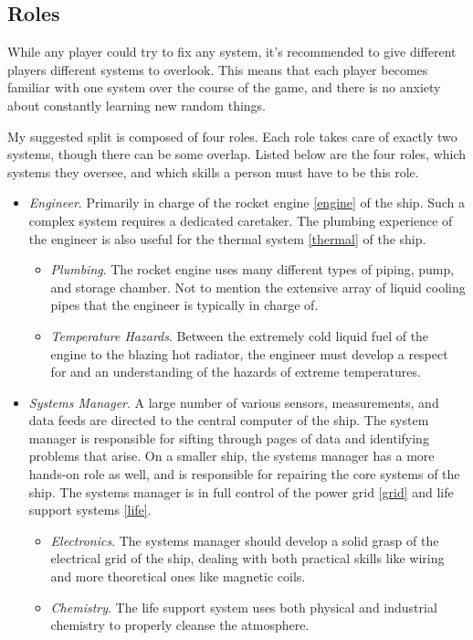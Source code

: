 \documentclass[a4paper]{article}
\begin{document}
\subsection{Roles}

While any player could try to fix any system, it's recommended to give different players different systems to overlook. This means that each player becomes familiar with one system over the course of the game, and there is no anxiety about constantly learning new random things. 

My suggested split is composed of four roles. Each role takes care of exactly two systems, though there can be some overlap. Listed below are the four roles, which systems they oversee, and which skills a person must have to be this role.
\begin{itemize}
\item \textit{Engineer}. Primarily in charge of the rocket engine \ref{engine} of the ship. Such a complex system requires a dedicated caretaker. The plumbing experience of the engineer is also useful for the thermal system \ref{thermal} of the ship.
\begin{itemize}
\item \textit{Plumbing}. The rocket engine uses many different types of piping, pump, and storage chamber. Not to mention the extensive array of liquid cooling pipes that the engineer is typically in charge of.
\item \textit{Temperature Hazards}. Between the extremely cold liquid fuel of the engine to the blazing hot radiator, the engineer must develop a respect for and an understanding of the hazards of extreme temperatures.
\end{itemize}
\item \textit{Systems Manager}. A large number of various sensors, measurements, and data feeds are directed to the central computer of the ship. The system manager is responsible for sifting through pages of data and identifying problems that arise. On a smaller ship, the systems manager has a more hands-on role as well, and is responsible for repairing the core systems of the ship. The systems manager is in full control of the power grid \ref{grid} and life support systems \ref{life}.
\begin{itemize}
\item \textit{Electronics}. The systems manager should develop a solid grasp of the electrical grid of the ship, dealing with both practical skills like wiring and more theoretical ones like magnetic coils.
\item \textit{Chemistry}. The life support system uses both physical and industrial chemistry to properly cleanse the atmosphere. 

\end{itemize}
\end{itemize}
\end{document}
